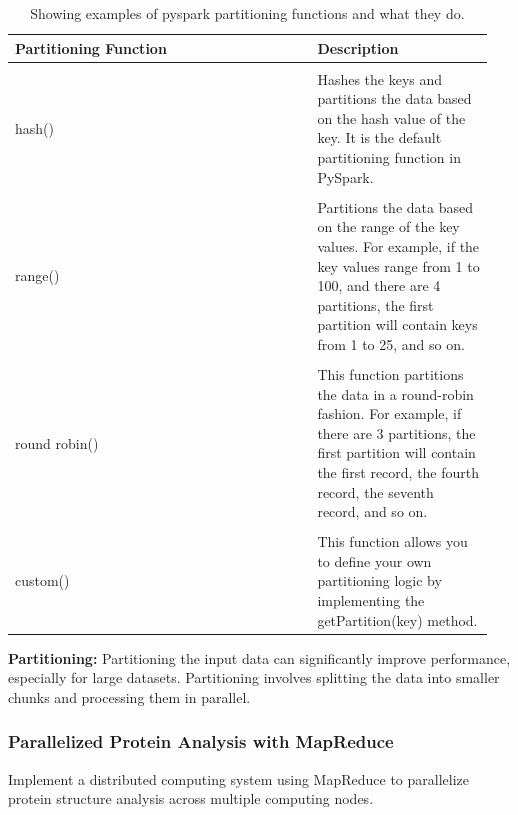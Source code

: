 \documentclass[]{final_report}
\begin{document}
\clearpage

\begin{table}[ht!]
    \begin{center}
    \label{tab:partitioning}
        \begin{tabular}{p{0.6\linewidth}|p{0.35\linewidth}}
        Partitioning Function & Description\\
        \hline
        \\
        hash() & Hashes the keys and partitions the data based on the hash value of the key. It is the default partitioning function in PySpark.
        \\
        \hline
        \\
        range() & Partitions the data based on the range of the key values. For example, if the key values range from 1 to 100, and there are 4 partitions, the first partition will contain keys from 1 to 25, and so on.
        \\
        \hline
        \\
        round robin() & This function partitions the data in a round-robin fashion. For example, if there are 3 partitions, the first partition will contain the first record, the fourth record, the seventh record, and so on.
        \\
        \hline
        \\
        custom() & This function allows you to define your own partitioning logic by implementing the getPartition(key) method.
        \end{tabular}
        \caption{\label{partitioning}Showing examples of pyspark partitioning functions and what they do.}
    \end{center}
\end{table}

\vspace{60px}

\textbf{Partitioning:} Partitioning the input data can significantly improve performance, especially for large datasets. Partitioning involves splitting the data into smaller chunks and processing them in parallel.

\clearpage

\subsubsection{Parallelized Protein Analysis with MapReduce}

\begin{displayquote}
    Implement a distributed computing system using MapReduce to parallelize protein structure analysis across multiple computing nodes.
\end{displayquote}
\end{document}

